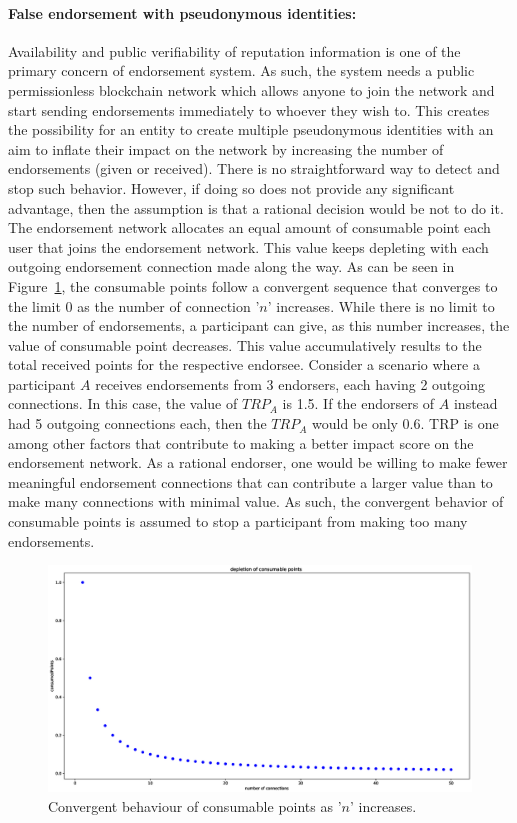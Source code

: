 \paragraph{False endorsement with pseudonymous identities:} Availability and
public verifiability of reputation information is one of the primary concern of
endorsement system. As such, the system needs a public permissionless
blockchain network which allows anyone to join the network and start sending
endorsements immediately to whoever they wish to. This creates the possibility
for an entity to create multiple pseudonymous identities with an aim to inflate
their impact on the network by increasing the number of endorsements (given or
received). There is no straightforward way to detect and stop such behavior.
However, if doing so does not provide any significant advantage, then the
assumption is that a rational decision would be not to do it. The endorsement
network allocates an equal amount of consumable point each user that joins the
endorsement network. This value keeps depleting with each outgoing endorsement
connection made along the way. As can be seen in Figure~\ref{consumablePoint},
the consumable points follow a convergent sequence that converges to the limit
0 as the number of connection '$n$' increases. While there is no limit to the
number of endorsements, a participant can give, as this number increases, the
value of consumable point decreases. This value accumulatively results to the
total received points for the respective endorsee. Consider a scenario where a
participant $A$ receives endorsements from 3 endorsers, each having 2 outgoing
connections. In this case, the value of $TRP_{A}$ is 1.5. If the endorsers of
$A$ instead had 5 outgoing connections each, then the $TRP_{A}$ would be only
0.6. \ac{TRP} is one among other factors that contribute to making a better
impact score on the endorsement network. As a rational endorser, one would be
willing to make fewer meaningful endorsement connections that can contribute a
larger value than to make many connections with minimal value. As such, the
convergent behavior of consumable points is assumed to stop a participant from
making too many endorsements. 
\begin{figure}
	\includegraphics[width=1.2\textwidth]{Images/ConsumablePoints.eps}
	\caption{Convergent behaviour of consumable points as '$n$' increases.}
	\label{consumablePoint}
\end{figure}
